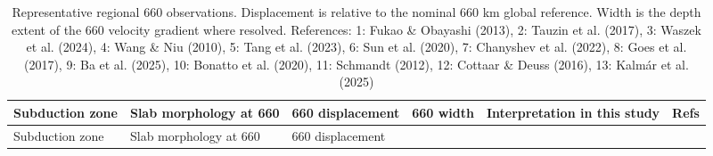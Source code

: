 \documentclass[draft,linenumbers]{agujournal2019}
\begin{document}
\begin{longtable}[]{@{}
  >{\raggedright\arraybackslash}p{}
  >{\raggedright\arraybackslash}p{}
  >{\raggedright\arraybackslash}p{}
  >{\raggedright\arraybackslash}p{}
  >{\raggedright\arraybackslash}p{}
  >{\raggedright\arraybackslash}p{}@{}}
\caption{Representative regional 660 observations. Displacement is
relative to the nominal 660 km global reference. Width is the depth
extent of the 660 velocity gradient where resolved. References: 1: Fukao
\& Obayashi (2013), 2: Tauzin et al. (2017), 3: Waszek et al. (2024), 4:
Wang \& Niu (2010), 5: Tang et al. (2023), 6: Sun et al. (2020), 7:
{Chanyshev et al.} (2022), 8: {Goes et al.} (2017), 9: Ba et al. (2025),
10: Bonatto et al. (2020), 11: Schmandt (2012), 12: Cottaar \& Deuss
(2016), 13: Kalmár et al.
(2025)}\label{tbl:regional-observations}\tabularnewline
\toprule\noalign{}
\begin{minipage}[b]{\linewidth}\raggedright
Subduction zone
\end{minipage} & \begin{minipage}[b]{\linewidth}\raggedright
Slab morphology at 660
\end{minipage} & \begin{minipage}[b]{\linewidth}\raggedright
660 displacement
\end{minipage} & \begin{minipage}[b]{\linewidth}\raggedright
660 width
\end{minipage} & \begin{minipage}[b]{\linewidth}\raggedright
Interpretation in this study
\end{minipage} & \begin{minipage}[b]{\linewidth}\raggedright
Refs
\end{minipage} \\
\midrule\noalign{}
\endfirsthead
\toprule\noalign{}
\begin{minipage}[b]{\linewidth}\raggedright
Subduction zone
\end{minipage} & \begin{minipage}[b]{\linewidth}\raggedright
Slab morphology at 660
\end{minipage} & \begin{minipage}[b]{\linewidth}\raggedright
660 displacement
\end{minipage} & \begin{minipage}[b]{\linewidth}\raggedright

\end{minipage}
\end{longtable}
\end{document}
